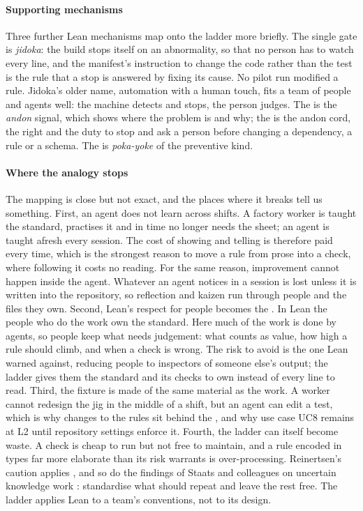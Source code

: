 \paragraph{Supporting mechanisms} Three further Lean mechanisms map onto the ladder more briefly.
The single gate is \emph{jidoka}: the build stops itself on an abnormality, so that no person has
to watch every line, and the manifest's instruction to change the code rather than the test is
the rule that a stop is answered by fixing its cause. No pilot run modified a rule. Jidoka's
older name, automation with a human touch, fits a team of people and agents well: the machine
detects and stops, the person judges. The  is the \emph{andon} signal,
which shows where the problem is and why; the  is the andon cord, the
right and the duty to stop and ask a person before changing a dependency, a rule or a schema. The
 is \emph{poka-yoke} of the preventive kind.

\paragraph{Where the analogy stops} The mapping is close but not exact, and the places where it
breaks tell us something. First, an agent does not learn across shifts. A factory worker is taught the
standard, practises it and in time no longer needs the sheet; an agent is taught afresh every
session. The cost of showing and telling is therefore paid every time, which is the strongest
reason to move a rule from prose into a check, where following it costs no reading. For the same
reason, improvement cannot happen inside the agent. Whatever an agent notices in a session is lost
unless it is written into the repository, so reflection and kaizen run through people and the
files they own. Second, Lean's respect for people becomes the . In Lean the
people who do the work own the standard. Here much of the work is done by agents, so people keep
what needs judgement: what counts as value, how high a rule should climb, and when a check is
wrong. The risk to avoid is the one Lean warned against, reducing people to inspectors of someone
else's output; the ladder gives them the standard and its checks to own instead of every line to
read. Third, the fixture is made of the same material as the work. A worker cannot redesign the jig
in the middle of a shift, but an agent can edit a test, which is why changes to the rules sit
behind the , and why use case UC8 remains at L2 until repository settings
enforce it. Fourth, the ladder can itself become waste. A check is cheap to run but not free to
maintain, and a rule encoded in types far more elaborate than its risk warrants is
over-processing. Reinertsen's caution applies \citep{reinertsen2009principles}, and so do the
findings of Staats and colleagues on uncertain knowledge work \citep{staats2011lean}: standardise
what should repeat and leave the rest free. The ladder applies Lean to a team's conventions, not
to its design.

